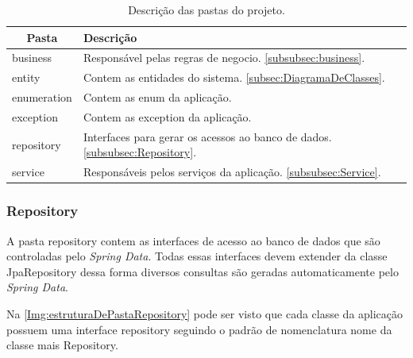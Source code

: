 \begin{table}[!ht]
\centering
\begin{tabular}{|l|l|}
\hline
\multicolumn{1}{|c|}{{\color[HTML]{000000} \textbf{Pasta}}} & {\color[HTML]{000000} \textbf{Descrição}} \\ \hline
business                                                    & \multicolumn{1}{p{10.00cm}|}{Responsável pelas regras de negocio. \autoref{subsubsec:business}. }\\ \hline
entity                                                      & \multicolumn{1}{p{10.00cm}|}{Contem as entidades do sistema. \autoref{subsec:DiagramaDeClasses}. }\\ \hline
enumeration                                                 & \multicolumn{1}{p{10.00cm}|}{Contem as enum da aplicação.}\\ \hline
exception                                                   & \multicolumn{1}{p{10.00cm}|}{Contem as exception da aplicação.}\\ \hline
repository                                                  & \multicolumn{1}{p{10.00cm}|}{Interfaces para gerar os acessos ao banco de dados. \autoref{subsubsec:Repository}.}\\ \hline
service                                                     & \multicolumn{1}{p{10.00cm}|}{Responsáveis pelos serviços da aplicação. \autoref{subsubsec:Service}.}\\ \hline
\end{tabular}
\caption{Descrição das pastas do projeto.}
\label{Tab:DescricaoDasPastasProjeto}
\end{table}


\subsubsection{Repository}\label{subsubsec:Repository}

A pasta repository contem as interfaces de acesso ao banco de dados que são controladas pelo \textit{Spring Data}. Todas essas interfaces devem extender da classe JpaRepository dessa forma diversos consultas são geradas automaticamente pelo \textit{Spring Data}.

Na \autoref{Img:estruturaDePastaRepository} pode ser visto que cada classe da aplicação possuem uma interface repository seguindo o padrão de nomenclatura nome da classe mais Repository.

